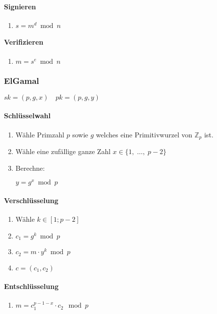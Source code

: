 \documentclass[8pt,a4paper,landscape]{article}
\newcommand{\Z}[1]{\ensuremath{\mathbb{Z}_{#1}}}
\newcommand{\skey}{\ensuremath{sk}}
\newcommand{\pkey}{\ensuremath{pk}}
\begin{document}
\begin{multicols*}{4}
 \paragraph{Signieren}
 \begin{enumerate}[itemsep=2pt,leftmargin=15pt]
  \item $s = m^d \bmod n$
 \end{enumerate}

 \paragraph{Verifizieren}
 \begin{enumerate}[itemsep=2pt,leftmargin=15pt]
  \item $m = s^e \bmod n$
 \end{enumerate}
 
 \subsubsection{ElGamal}
 $\skey = (p,g,x) \quad \pkey = (p,g,y)$
 
 \paragraph{Schlüsselwahl}
 \begin{enumerate}
  \item Wähle Primzahl $p$ sowie $g$ welches eine Primitivwurzel von $\Z{p}$ ist.
  \item Wähle eine zufällige ganze Zahl $x \in \{1,\;\ldots,\;p-2\}$
  \item Berechne: \par
  $y = g^x \bmod p$
 \end{enumerate}
 
 \paragraph{Verschlüsselung}
 \begin{enumerate}
  \item Wähle $k \in [1;p-2]$
  \item $c_1 = g^k \bmod p$
  \item $c_2 = m \cdot y^k \bmod p$
  \item $c = (c_1,c_2)$
 \end{enumerate}
 
 \paragraph{Entschlüsselung}
 \begin{enumerate}
  \item $m = c_{1}^{p-1-x} \cdot c_{2} \mod p$
 \end{enumerate}
 

\end{multicols*}
\end{document}
